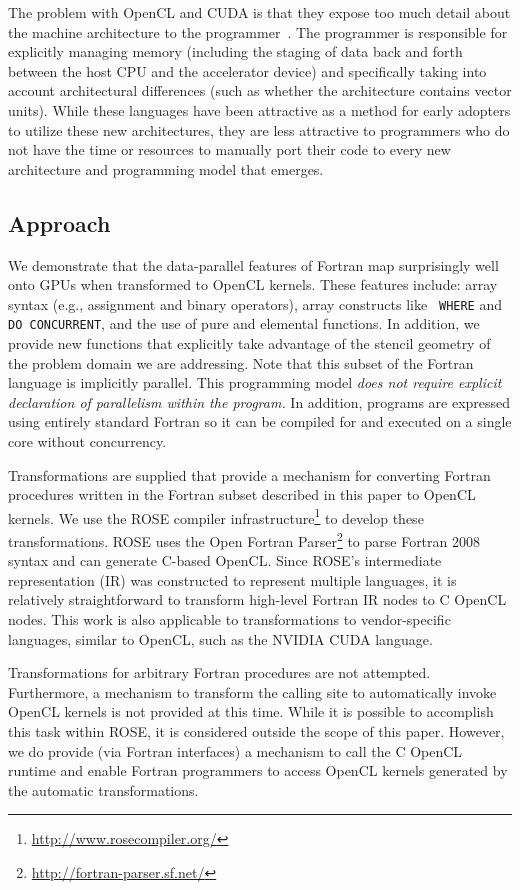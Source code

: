 The problem with OpenCL and CUDA is that they expose too much detail about the
machine architecture to the programmer~\cite{wolfeSC10}.  The programmer is
responsible for explicitly managing memory (including the staging of data back
and forth between the host CPU and the accelerator device) and specifically
taking into account architectural differences (such as whether the architecture
contains vector units).  While these languages have been attractive as a method
for early adopters to utilize these new architectures, they are less attractive
to programmers who do not have the time or resources to manually port their code
to every new architecture and programming model that emerges.

\subsection{Approach}

We demonstrate that the data-parallel features of Fortran map surprisingly well
onto GPUs when transformed to OpenCL kernels.  These features include: array
syntax (e.g., assignment and binary operators), array constructs like {\tt
  WHERE} and {\tt DO CONCURRENT}, and the use of pure and elemental functions.
In addition, we provide new functions that explicitly take advantage of the
stencil geometry of the problem domain we are addressing.  Note that this subset
of the Fortran language is implicitly parallel.  This programming model
\emph{does not require explicit declaration of parallelism within the program.}
In addition, programs are expressed using entirely standard Fortran so it can be
compiled for and executed on a single core without concurrency.

Transformations are supplied that provide a mechanism for converting Fortran
procedures written in the Fortran subset described in this paper to OpenCL
kernels.  We use the ROSE compiler
infrastructure\footnote{\url{http://www.rosecompiler.org/}} to develop these
transformations.  ROSE uses the Open Fortran
Parser\footnote{\url{http://fortran-parser.sf.net/}} to parse Fortran 2008
syntax and can generate C-based OpenCL.  Since ROSE's intermediate
representation (IR) was constructed to represent multiple languages, it is
relatively straightforward to transform high-level Fortran IR nodes to C OpenCL
nodes.  This work is also applicable to transformations to vendor-specific
languages, similar to OpenCL, such as the NVIDIA CUDA language.

Transformations for arbitrary Fortran procedures are not attempted.
Furthermore, a mechanism to transform the calling site to automatically invoke
OpenCL kernels is not provided at this time.  While it is possible to accomplish
this task within ROSE, it is considered outside the scope of this paper.
However, we do provide (via Fortran interfaces) a mechanism to call the C OpenCL
runtime and enable Fortran programmers to access OpenCL kernels generated by the
automatic transformations.

